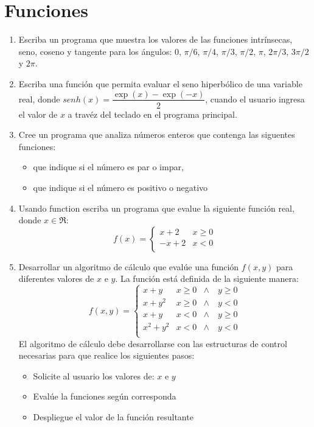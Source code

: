 \documentclass[11pt]{exam}
\begin{document}
\section{Funciones}
\begin{enumerate}

\item Escriba un programa que muestra los valores de las funciones intr\'insecas, seno, coseno y tangente para los \'angulos: 0, $\pi /6$, $\pi /4$, $\pi /3$, $\pi /2$, $\pi$, $2\pi/3$, $3\pi /2$
y $2 \pi$.
\item Escriba una funci\'on que permita evaluar el seno hiperb\'olico de una variable real, donde $senh(x)=\dfrac{\exp(x)-\exp(-x)} {2}$, cuando
el usuario ingresa el valor de $x$ a trav\'ez del teclado en el programa principal.
\item Cree un programa que analiza n\'umeros enteros que contenga las siguentes funciones:
\begin{itemize}
 \item que indique si el n\'umero es par o impar, 
\item  que indique si el n\'umero es positivo o negativo

\end{itemize}

\item Usando function escriba un programa que evalue la siguiente  funci\'on real, donde $x\in \Re$:
 $$f(x)=\left\lbrace 
\begin{array}{ll}
x+ 2 &  x \geq 0 \\
-x +2 & x < 0 \\
\end{array}\right. $$
\item 
Desarrollar un algoritmo de c\'alculo que eval\'ue una funci\'on $f(x,y)$ para diferentes
valores de $x$ e $ y$. La funci\'on est\'a definida de la siguiente manera:
$$f(x,y)=\left\lbrace 
\begin{array}{lll}
x+ y &  x \geq 0 & \wedge \quad  y \geq 0\\
x + y^{2} & x \geq 0 & \wedge \quad y < 0\\
x +y & x < 0 & \wedge \quad  y\geq0\\
x^{2}  + y^{2} &  x < 0 & \wedge \quad y < 0\\
\end{array}\right. $$
  El algoritmo de c\'alculo debe desarrollarse con las estructuras de control necesarias para
que realice los siguientes pasos:
\begin{itemize}
\item  Solicite al usuario los valores de: $x$ e $y$
\item Eval\'ue la funciones seg\'un corresponda
\item Despliegue el valor de la funci\'on resultante
\end{itemize}

\end{enumerate}
\end{document}
